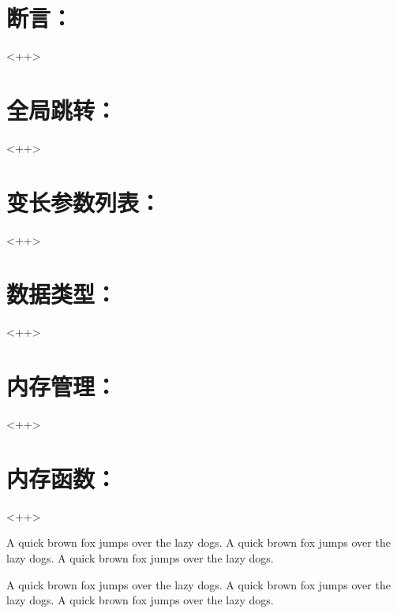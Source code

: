 \section{断言：}
<++>

\section{全局跳转：}
<++>

\section{变长参数列表：}
<++>

\section{数据类型：}
<++>

\section{内存管理：}
<++>

\section{内存函数：}
<++>

A quick brown fox jumps over the lazy dogs.
A quick brown fox jumps over the lazy dogs.
A quick brown fox jumps over the lazy dogs.

A quick brown fox jumps over the lazy dogs.
A quick brown fox jumps over the lazy dogs.
A quick brown fox jumps over the lazy dogs.


